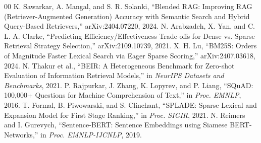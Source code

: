 \documentclass[conference]{IEEEtran}
\begin{document}
\begin{thebibliography}{00}
 K. Sawarkar, A. Mangal, and S. R. Solanki, ``Blended RAG: Improving RAG (Retriever-Augmented Generation) Accuracy with Semantic Search and Hybrid Query-Based Retrievers,'' arXiv:2404.07220, 2024.
 N. Arabzadeh, X. Yan, and C. L. A. Clarke, ``Predicting Efficiency/Effectiveness Trade-offs for Dense vs. Sparse Retrieval Strategy Selection,'' arXiv:2109.10739, 2021.
 X. H. Lu, ``BM25S: Orders of Magnitude Faster Lexical Search via Eager Sparse Scoring,'' arXiv:2407.03618, 2024.
 N. Thakur et al., ``BEIR: A Heterogeneous Benchmark for Zero-shot Evaluation of Information Retrieval Models,'' in \emph{NeurIPS Datasets and Benchmarks}, 2021.
 P. Rajpurkar, J. Zhang, K. Lopyrev, and P. Liang, ``SQuAD: 100,000+ Questions for Machine Comprehension of Text,'' in \emph{Proc. EMNLP}, 2016.
 T. Formal, B. Piwowarski, and S. Clinchant, ``SPLADE: Sparse Lexical and Expansion Model for First Stage Ranking,'' in \emph{Proc. SIGIR}, 2021.
 N. Reimers and I. Gurevych, ``Sentence-BERT: Sentence Embeddings using Siamese BERT-Networks,'' in \emph{Proc. EMNLP-IJCNLP}, 2019.
\end{thebibliography}
\end{document}
